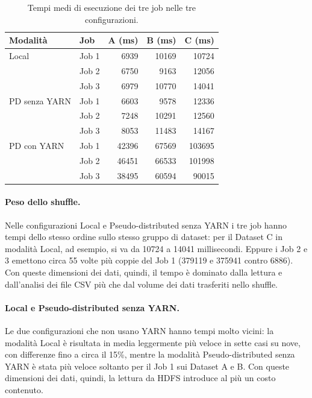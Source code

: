 \documentclass[12pt, a4paper]{article}
\begin{document}
\begin{table}[H]
\centering
\small
\begin{tabular}{|l|l|r|r|r|}
\hline
\textbf{Modalità} & \textbf{Job} &
\textbf{A (ms)} & \textbf{B (ms)} & \textbf{C (ms)} \\
\hline
Local & Job 1 & 6939 & 10169 & 10724 \\
 & Job 2 & 6750 & 9163 & 12056 \\
 & Job 3 & 6979 & 10770 & 14041 \\
\hline
PD senza YARN & Job 1 & 6603 & 9578 & 12336 \\
 & Job 2 & 7248 & 10291 & 12560 \\
 & Job 3 & 8053 & 11483 & 14167 \\
\hline
PD con YARN & Job 1 & 42396 & 67569 & 103695 \\
 & Job 2 & 46451 & 66533 & 101998 \\
 & Job 3 & 38495 & 60594 & 90015 \\
\hline
\end{tabular}
\caption{Tempi medi di esecuzione dei tre job nelle tre configurazioni.}
\label{tab:confrontojob}
\end{table}

\paragraph{Peso dello shuffle.}
Nelle configurazioni Local e Pseudo-distributed senza YARN
i tre job hanno tempi dello stesso ordine sullo stesso gruppo
di dataset: per il Dataset C in modalità Local, ad esempio,
si va da 10724 a 14041 millisecondi.
Eppure i Job 2 e 3 emettono circa 55 volte più coppie
del Job 1 (379119 e 375941 contro 6886).
Con queste dimensioni dei dati, quindi, il tempo
è dominato dalla lettura e dall'analisi dei file CSV
più che dal volume dei dati trasferiti nello shuffle.

\paragraph{Local e Pseudo-distributed senza YARN.}
Le due configurazioni che non usano YARN hanno tempi
molto vicini: la modalità Local è risultata in media
leggermente più veloce in sette casi su nove, con differenze
fino a circa il 15\%, mentre la modalità Pseudo-distributed
senza YARN è stata più veloce soltanto per il Job 1
sui Dataset A e B. Con queste dimensioni dei dati,
quindi, la lettura da HDFS introduce al più
un costo contenuto.
\end{document}
